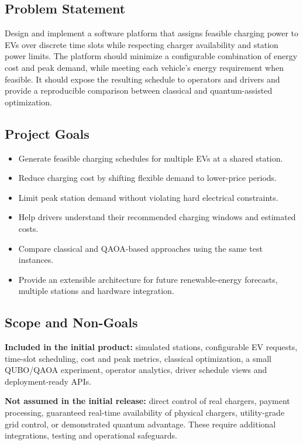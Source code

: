 \documentclass[11pt,a4paper]{article}
\begin{document}
\subsection{Problem Statement}

Design and implement a software platform that assigns feasible charging power to EVs over discrete time slots while respecting charger availability and station power limits. The platform should minimize a configurable combination of energy cost and peak demand, while meeting each vehicle's energy requirement when feasible. It should expose the resulting schedule to operators and drivers and provide a reproducible comparison between classical and quantum-assisted optimization.

\subsection{Project Goals}

\begin{itemize}
  \item Generate feasible charging schedules for multiple EVs at a shared station.
  \item Reduce charging cost by shifting flexible demand to lower-price periods.
  \item Limit peak station demand without violating hard electrical constraints.
  \item Help drivers understand their recommended charging windows and estimated costs.
  \item Compare classical and QAOA-based approaches using the same test instances.
  \item Provide an extensible architecture for future renewable-energy forecasts, multiple stations and hardware integration.
\end{itemize}

\subsection{Scope and Non-Goals}

\textbf{Included in the initial product:} simulated stations, configurable EV requests, time-slot scheduling, cost and peak metrics, classical optimization, a small QUBO/QAOA experiment, operator analytics, driver schedule views and deployment-ready APIs.

\textbf{Not assumed in the initial release:} direct control of real chargers, payment processing, guaranteed real-time availability of physical chargers, utility-grade grid control, or demonstrated quantum advantage. These require additional integrations, testing and operational safeguards.
\end{document}
